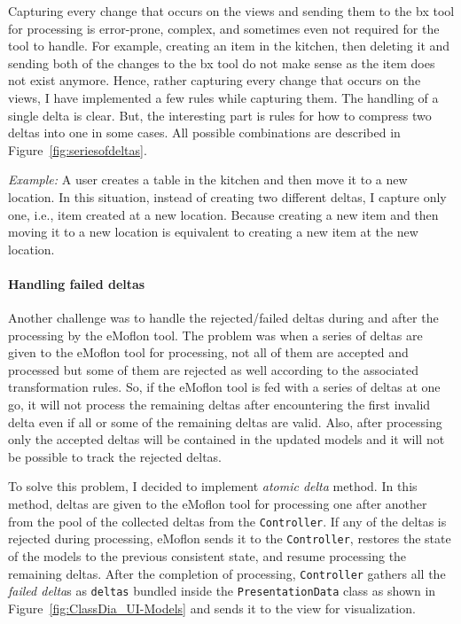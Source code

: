 Capturing every change that occurs on the views and sending them to the bx tool for processing is error-prone, complex, and sometimes even not required for the tool to handle. For example, creating an item in the kitchen, then deleting it and sending both of the changes to the bx tool do not make sense as the item does not exist anymore. Hence, rather capturing every change that occurs on the views, I have implemented a few rules while capturing them. The handling of a single delta is clear. But, the interesting part is rules for how to compress two deltas into one in some cases. All possible combinations are described in Figure~\ref{fig:seriesofdeltas}.

\textit{Example:} A user creates a table in the kitchen and then move it to a new location. In this situation, instead of creating two different deltas, I capture only one, i.e., item created at a new location. Because creating a new item and then moving it to a new location is equivalent to creating a new item at the new location.

\paragraph{Handling failed deltas}
Another challenge was to handle the rejected/failed deltas during and after the processing by the eMoflon tool. The problem was when a series of deltas are given to the eMoflon tool for processing, not all of them are accepted and processed but some of them are rejected as well according to the associated transformation rules. So, if the eMoflon tool is fed with a series of deltas at one go, it will not process the remaining deltas after encountering the first invalid delta even if all or some of the remaining deltas are valid. Also, after processing only the accepted deltas will be contained in the updated models and it will not be possible to track the rejected deltas. 

To solve this problem, I decided to implement \textit{atomic delta} method. In this method, deltas are given to the eMoflon tool for processing one after another from the pool of the collected deltas from the \texttt{Controller}. If any of the deltas is rejected during processing, eMoflon sends it to the \texttt{Controller}, restores the state of the models to the previous consistent state, and resume processing the remaining deltas. After the completion of processing, \texttt{Controller} gathers all the \textit{failed delta}s as \texttt{deltas} bundled inside the \texttt{PresentationData} class as shown in Figure~\ref{fig:ClassDia_UI-Models} and sends it to the view for visualization. 

